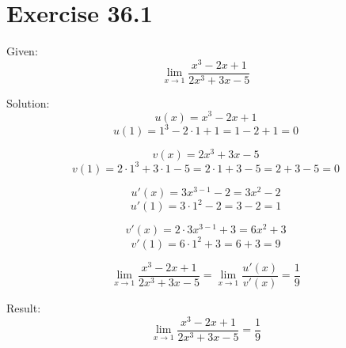 \documentclass[a4paper, 10pt]{scrartcl}
\begin{document}
\section{Exercise 36.1}

Given:
\[\lim_{x\to 1}{\frac{x^{3} - 2x + 1}{2x^{3} + 3x - 5}}\]

Solution:
\[u(x) = x^{3} - 2x + 1\]
\[u(1) = 1^{3} - 2\cdot 1 + 1 = 1 - 2 + 1 = 0\]

\[v(x) = 2x^{3} + 3x - 5\]
\[v(1) = 2\cdot 1^{3} + 3\cdot 1 - 5 = 2\cdot 1 + 3 - 5 = 2 + 3 - 5 = 0\]

\[u'(x) = 3x^{3 - 1} - 2 = 3x^{2} - 2\]
\[u'(1) = 3\cdot 1^{2} - 2 = 3 - 2 = 1\]

\[v'(x) = 2\cdot 3x^{3 - 1} + 3 = 6x^{2} + 3\]
\[v'(1) = 6\cdot 1^{2} + 3 = 6 + 3 = 9\]

\[\lim_{x\to 1}{\frac{x^{3} - 2x + 1}{2x^{3} + 3x - 5}} = \lim_{x\to 1}{\frac{u'(x)}{v'(x)}} =
        \frac{1}{9}\]

Result:
\[\lim_{x\to 1}{\frac{x^{3} - 2x + 1}{2x^{3} + 3x - 5}} = \frac{1}{9}\]
\end{document}

